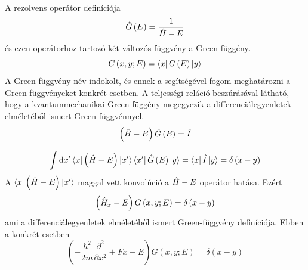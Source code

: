 A rezolvens operátor definíciója
\begin{equation}
    \hat{G}\left( E \right) = \frac{1}{\hat{H} - E}
\end{equation}
és ezen operátorhoz tartozó két változós függvény a Green-függény.
\begin{equation}
    G\left( x, y; E \right) = \Bra{x}G\left(E\right)\Ket{y}
\end{equation}
A Green-függvény név indokolt, és ennek a segítségével fogom meghatározni a Green-függvényeket konkrét esetben. A teljességi reláció beszúrásával látható, hogy a kvantummechanikai Green-függény megegyezik a differenciálegyenletek elméletéből ismert Green-függvénnyel.
\begin{equation}
    \left(\hat{H} - E\right) \hat{G}\left( E \right) = \hat{I}
\end{equation}

\begin{equation}
    \int \mathrm{d}x^\prime \Bra{x}\left(\hat{H} - E\right) \Ket{x^\prime}\Bra{x^\prime} \hat{G}\left( E \right)\Ket{y} = \Bra{x}\hat{I}\Ket{y} = \delta \left(x - y\right)
\end{equation} 
A $\Bra{x}\left(\hat{H} - E\right) \Ket{x^\prime}$ maggal vett konvolúció a $\hat{H} - E$ operátor hatása. Ezért
\begin{equation}
    \left(\hat{H}_x - E\right) G\left(x, y; E\right) = \delta\left(x - y\right)
\end{equation}
ami a differenciálegyenletek elméletéből ismert Green-függvény definíciója. Ebben a konkrét esetben
\begin{equation}
    \left( -\frac{\hbar^2}{2m}\frac{\partial^2}{\partial x^2} + Fx - E \right) G\left(x, y; E\right) = \delta\left(x - y\right)
	\label{green:deltaeq}
\end{equation}
